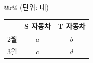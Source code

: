 \begin{tabular}{@{}r@{}}
{\footnotesize (단위: 대)}\\[1pt]
\begin{tabular}{|c|c|c|}
\hline
 & S 자동차 & T 자동차 \\
\hline
$2$월 & $a$ & $b$ \\
\hline
$3$월 & $c$ & $d$ \\
\hline
\end{tabular}
\end{tabular}
